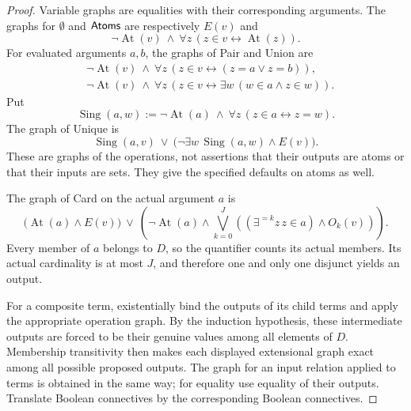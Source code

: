 \begin{proof}
Variable graphs are equalities with their corresponding arguments.
The graphs for \(\emptyset\) and \(\mathsf{Atoms}\) are respectively \(E(v)\) and
\[
 \neg\operatorname{At}(v)\ \land\
          \forall z\,(z\in v\longleftrightarrow\operatorname{At}(z)).
\]
For evaluated arguments \(a,b\), the graphs of Pair and Union are
\[
 \begin{split}
 &\neg\operatorname{At}(v)\ \land\
               \forall z\,(z\in v\longleftrightarrow(z=a\lor z=b)),\\
 &\neg\operatorname{At}(v)\ \land\
               \forall z\,(z\in v\longleftrightarrow
                            \exists w\,(w\in a\land z\in w)).
 \end{split}
\]
Put
\[
 \operatorname{Sing}(a,w):=
       \neg\operatorname{At}(a)\ \land\
                         \forall z\,(z\in a\longleftrightarrow z=w).
\]
The graph of Unique is
\[
 \operatorname{Sing}(a,v)\ \lor\
             \bigl(\neg\exists w\,\operatorname{Sing}(a,w)\land E(v)\bigr).
\]
These are graphs of the operations, not assertions that their outputs
are atoms or that their inputs are sets.  They give the specified
defaults on atoms as well.

The graph of Card on the actual argument \(a\) is
\[
 \bigl(\operatorname{At}(a)\land E(v)\bigr)\ \lor\
 \left(\neg\operatorname{At}(a)\land
   \bigvee_{k=0}^{J}
      \left((\exists^{=k}z\,z\in a)\land O_k(v)\right)\right).
\]
Every member of \(a\) belongs to \(D\), so the quantifier counts its
actual members.  Its actual cardinality is at most \(J\), and therefore
one and only one disjunct yields an output.

For a composite term, existentially bind the outputs of its child terms
and apply the appropriate operation graph.  By the induction hypothesis,
these intermediate outputs are forced to be their genuine values among
all elements of \(D\).  Membership transitivity then makes each displayed
extensional graph exact among all possible proposed outputs.  The graph
for an input relation applied to terms is obtained in the same way;
for equality use equality of their outputs.  Translate Boolean
connectives by the corresponding Boolean connectives.


\end{proof}

